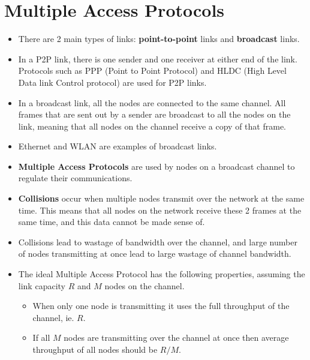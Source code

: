 \documentclass[a4paper]{article}
\theoremstyle{plain}
\theoremstyle{definition}
\begin{document}
\section{Multiple Access Protocols}
\begin{itemize}
    \item There are 2 main types of links: \textbf{point-to-point} links and \textbf{broadcast} links. 
    
    \item In a P2P link, there is one sender and one receiver at either end of the link. Protocols such as PPP (Point to Point Protocol) and HLDC (High Level Data link Control protocol) are used for P2P links. 
    
    \item In a broadcast link, all the nodes are connected to the same channel. All frames that are sent out by a sender are broadcast to all the nodes on the link, meaning that all nodes on the channel receive a copy of that frame.  
    
    \item Ethernet and WLAN are examples of broadcast links. 
    
    \item \textbf{Multiple Access Protocols} are used by nodes on a broadcast channel to regulate their communications. 
    
    \item \textbf{Collisions} occur when multiple nodes transmit over the network at the same time. This means that all nodes on the network receive these 2 frames at the same time, and this data cannot be made sense of. 
    
    \item Collisions lead to wastage of bandwidth over the channel, and large number of nodes transmitting at once lead to large wastage of channel bandwidth. 
    
    \item The ideal Multiple Access Protocol has the following properties, assuming the link capacity $R$ and $M$ nodes on the channel. 
    
    \begin{itemize}
        \item When only one node is transmitting it uses the full throughput of the channel, ie. $R$. 
        
        \item If all $M$ nodes are transmitting over the channel at once then average throughput of all nodes should be $R/M$.
        

\end{itemize}
\end{itemize}
\end{document}
